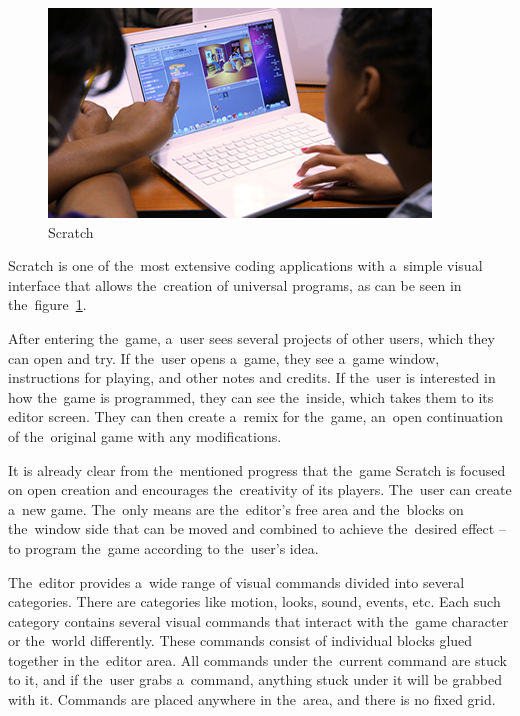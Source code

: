 \begin{figure}
    \centering
    \includegraphics[width=1\linewidth]{assets/similar-games/scratch.jpg}
    \caption{Scratch~\cite{a2022_scratch}}
    \label{fig:scratch}
\end{figure}

Scratch is one of the~most extensive coding applications with a~simple visual interface that allows the~creation of universal programs, as can be seen in the~figure~\ref{fig:scratch}.

After entering the~game, a~user sees several projects of other users, which they can open and try.
If the~user opens a~game, they see a~game window, instructions for playing, and other notes and credits.
If the~user is interested in how the~game is programmed, they can see the~inside, which takes them to its editor screen.
They can then create a~remix for the~game, an~open continuation of the~original game with any modifications.

It is already clear from the~mentioned progress that the~game Scratch is focused on open creation and encourages the~creativity of its players.
The~user can create a~new game.
The~only means are the~editor's free area and the~blocks on the~window side that can be moved and combined to achieve the~desired effect -- to program the~game according to the~user's idea.

The~editor provides a~wide range of visual commands divided into several categories.
There are categories like motion, looks, sound, events, etc.
Each such category contains several visual commands that interact with the~game character or the~world differently.
These commands consist of individual blocks glued together in the~editor area.
All commands under the~current command are stuck to it, and if the~user grabs a~command, anything stuck under it will be grabbed with it.
Commands are placed anywhere in the~area, and there is no fixed grid.

